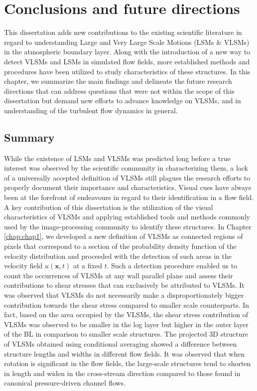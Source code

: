 
\chapter{Conclusions and future directions}\label{chap:conclusion}
This dissertation adds new contributions to the existing scientific literature in regard to understanding Large and Very Large Scale Motions (LSMs \& VLSMs) in the atmospheric boundary layer. Along with the introduction of a new way to detect VLSMs and LSMs in simulated flow fields, more established methods and procedures have been utilized to study characteristics of these structures. In this chapter, we summarize the main findings and delineate the future research directions that can address questions that were not within the scope of this dissertation but demand new efforts to advance knowledge on VLSMs, and in understanding of the turbulent flow dynamics in general. 

\section{Summary}
While the existence of LSMs and VLSMs was predicted long before a true interest was observed by the scientific community in characterizing them, a lack of a universally accepted definition of VLSMs still plagues the research efforts to properly document their importance and characteristics. Visual cues have always been at the forefront of endeavours in regard to their identification in a flow field. A key contribution of this dissertation is the utilization of the visual characteristics of VLSMs and applying established tools and methods commonly used by the image-processing community to identify these structures. In Chapter \ref{chap:chap1}, we developed a new definition of VLSMs as connected regions of pixels that correspond to a section of the probability density function of the velocity distribution and proceeded with the detection of such areas in the velocity field $u(\mathbf{x}, t)$ at a fixed $t$. Such a detection procedure enabled us to count the occurrences of VLSMs at any wall parallel plane and assess their contributions to shear stresses that can exclusively be attributed to VLSMs. It was observed that VLSMs do not necessarily make a disproportionately bigger contribution towards the shear stress compared to smaller scale counterparts. In fact, based on the area occupied by the VLSMs, the shear stress contribution of VLSMs was observed to be smaller in the log layer but higher in the outer layer of the BL in comparison to smaller scale structures. The projected 3D structure of VLSMs obtained using conditional averaging showed a difference between structure lengths and widths in different flow fields. It was observed that when rotation is significant in the flow fields, the large-scale structures tend to shorten in length and widen in the cross-stream direction compared to those found in canonical pressure-driven channel flows. 

